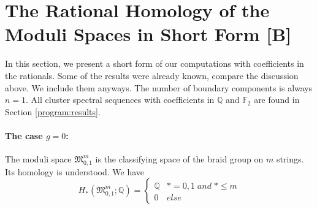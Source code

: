 \section{The Rational Homology of the Moduli Spaces in Short Form [B]}
\label{introduction:more_rational_homology}
In this section, we present a short form of our computations with coefficients in the rationals.
Some of the results were already known, compare the discussion above.
We include them anyways.
The number of boundary components is always $n=1$.
All cluster spectral sequences with coefficients in $\mathbb Q$ and $\mathbb F_2$ are found in Section \ref{program:results}.

\paragraph{The case \texorpdfstring{$g=0$}{g=0}:}
The moduli space $\mathfrak M_{0,1}^m$ is the classifying space of the braid group on $m$ strings.
Its homology is understood.
We have
\[
    H_\ast(\mathfrak M_{0,1}^m; \mathbb Q) =
        \begin{cases}
            \mathbb Q   & \ast = 0,1 \; and\; \ast \le m \\
            0           & else
        \end{cases}
\]

